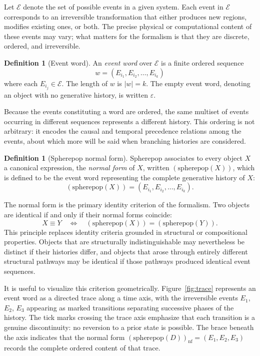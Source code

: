 \documentclass[12pt]{article}
\theoremstyle{plain}
\theoremstyle{definition}
\newtheorem{definition}[theorem]{Definition}
\theoremstyle{remark}
\begin{document}
Let $\mathcal{E}$ denote the set of possible events in a given system.  Each
event in $\mathcal{E}$ corresponds to an irreversible transformation that
either produces new regions, modifies existing ones, or both.  The precise
physical or computational content of these events may vary; what matters for
the formalism is that they are discrete, ordered, and irreversible.

\begin{definition}[Event word]
An \emph{event word} over $\mathcal{E}$ is a finite ordered sequence
\[
  w = (E_{i_1}, E_{i_2}, \dots, E_{i_k})
\]
where each $E_{i_j} \in \mathcal{E}$.  The length of $w$ is $|w| = k$.  The
empty event word, denoting an object with no generative history, is written
$\varepsilon$.
\end{definition}

Because the events constituting a word are ordered, the same multiset of
events occurring in different sequences represents a different history.  This
ordering is not arbitrary: it encodes the causal and temporal precedence
relations among the events, about which more will be said when branching
histories are considered.

\begin{definition}[Spherepop normal form]
Spherepop associates to every object $X$ a canonical expression, the
\emph{normal form} of $X$, written $(\text{spherepop}(X))$, which is defined
to be the event word representing the complete generative history of $X$:
\[
  (\text{spherepop}(X)) = (E_{i_1}, E_{i_2}, \dots, E_{i_k}).
\]
\end{definition}

The normal form is the primary identity criterion of the formalism.  Two
objects are identical if and only if their normal forms coincide:
\[
  X \equiv Y
  \quad\Longleftrightarrow\quad
  (\text{spherepop}(X)) = (\text{spherepop}(Y)).
\]
This principle replaces identity criteria grounded in structural or
compositional properties.  Objects that are structurally indistinguishable
may nevertheless be distinct if their histories differ, and objects that
arose through entirely different structural pathways may be identical if
those pathways produced identical event sequences.

It is useful to visualize this criterion geometrically.  Figure~\ref{fig:trace}
represents an event word as a directed trace along a time axis, with the
irreversible events $E_1$, $E_2$, $E_3$ appearing as marked transitions
separating successive phases of the history.  The tick marks crossing the
trace axis emphasize that each transition is a genuine discontinuity: no
reversion to a prior state is possible.  The brace beneath the axis
indicates that the normal form $(\mathrm{spherepop}(D))_{\mathrm{nf}} =
(E_1, E_2, E_3)$ records the complete ordered content of that trace.
\end{document}
